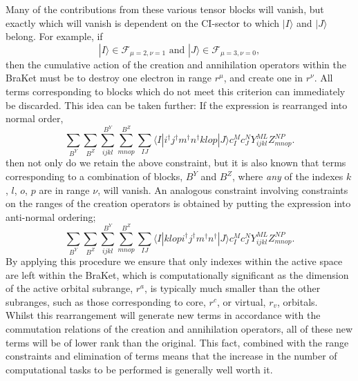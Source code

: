 \noindent Many of the contributions from these various tensor blocks will
vanish, but exactly which will vanish is dependent on the CI-sector to which
$|I \rangle$ and $|J \rangle$ belong. For example, if 
\begin{equation*}
|I\rangle \in \mathcal{F}_{\mu = 2,\nu = 1} \text{ \ \ \ \ and  \ \ \ \ } |J\rangle \in \mathcal{F}_{\mu = 3,\nu = 0},
\end{equation*}
then the cumulative action of the creation and annihilation operators within
the BraKet must be to destroy one electron in range $r^{\mu}$, and create one
in $r^{\nu}$. All terms corresponding to blocks which do not meet this
criterion can immediately be discarded. This idea can be taken further: If the
expression is rearranged into normal order,
\begin{equation}
\sum_{B^{Y}}\sum_{B^{Z}}
\sum^{B^{Y}}_{ijkl}\sum^{B^{Z}}_{mnop} \sum_{IJ} \langle I | i^{\dagger}j^{\dagger}m^{\dagger}n^{\dagger}klop | J \rangle c^{M}_{I} c_{J}^{N} Y^{ML}_{ijkl}Z^{NP}_{mnop}.
\label{eqn:basic_term_nordered}
\end{equation}
\noindent then not only do we retain the above constraint, but it is also known
that terms corresponding to a combination of blocks, $B^{Y}$ and $B^{Z}$, where
\emph{any} of the indexes $k$, $l$, $o$, $p$ are in range $\nu$, will vanish.
An analogous constraint involving constraints on the ranges of the creation 
operators is obtained by putting the expression into anti-normal ordering;
\begin{equation}
\sum_{B^{Y}}\sum_{B^{Z}}
\sum^{B^{Y}}_{ijkl}\sum^{B^{Z}}_{mnop} \sum_{IJ} \langle I |klop i^{\dagger}j^{\dagger}m^{\dagger}n^{\dagger} | J \rangle c^{M}_{I} c_{J}^{N} Y^{ML}_{ijkl}Z^{NP}_{mnop}.
\label{eqn:basic_term_anordered}
\end{equation}
\noindent By applying this procedure we ensure that only indexes within the
active space are left within the BraKet, which is computationally significant
as the dimension of the active orbital subrange, $r^{a}$, is typically much
smaller than the other subranges, such as those corresponding to core, $r^{c}$, or virtual, $r_{v}$, orbitals.\\

\noindent Whilst this rearrangement will generate new terms in accordance with
the commutation relations of the creation and annihilation operators, all of
these new terms will be of lower rank than the original.  This fact, combined
with the range constraints and elimination of terms means that the increase
in the number of computational tasks to be performed is generally well worth it.\\  

